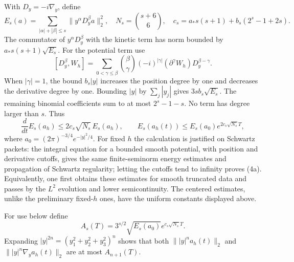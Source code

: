 \documentclass[11pt,a4paper]{article}
\begin{document}
With \(D_y=-i\nabla_y\), define
\[E_s(a)=\sum_{|\alpha|+|\beta|\le s}\|y^\alpha D_y^\beta a\|_2^2,
\quad N_s=\binom{s+6}{6},\quad
c_s=a_*s(s+1)+b_s(2^s-1+2s).\] The commutator of \(y^\alpha D_y^\beta\)
with the kinetic term has norm bounded by \(a_*s(s+1)\sqrt{E_s}\). For
the potential term use \[[D_y^\beta,W_h]=
\sum_{0<\gamma\le\beta}\binom{\beta}{\gamma}
(-i)^{|\gamma|}(\partial^\gamma W_h)D_y^{\beta-\gamma}.\] When
\(|\gamma|=1\), the bound \(b_s|y|\) increases the position degree by
one and decreases the derivative degree by one. Bounding \(|y|\) by
\(\sum_j|y_j|\) gives \(3s b_s\sqrt{E_s}\). The remaining binomial
coefficients sum to at most \(2^s-1-s\). No term has degree larger than
\(s\). Thus \[\frac{d}{dt}E_s(a_h)\le2c_s\sqrt{N_s}\,E_s(a_h),\qquad
E_s(a_h(t))\le E_s(a_0)e^{2c_s\sqrt{N_s}T},\tag{4a}\] where
\(a_0=(2\pi)^{-3/4}e^{-|y|^2/4}\). For fixed \(h\) the calculation is
justified on Schwartz packets: the integral equation for a bounded
smooth potential, with position and derivative cutoffs, gives the same
finite-seminorm energy estimates and propagation of Schwartz regularity;
letting the cutoffs tend to infinity proves (4a). Equivalently, one
first obtains these estimates for smooth truncated data and passes by
the \(L^2\) evolution and lower semicontinuity. The centered estimates,
unlike the preliminary fixed-\(h\) ones, have the uniform constants
displayed above.

For use below define
\[A_s(T)=3^{s/2}\sqrt{E_s(a_0)}e^{c_s\sqrt{N_s}T}.\] Expanding
\(|y|^{2n}=(y_1^2+y_2^2+y_3^2)^n\) shows that both \(\||y|^na_h(t)\|_2\)
and \(\||y|^n\nabla_ya_h(t)\|_2\) are at most \(A_{n+1}(T)\).
\end{document}
